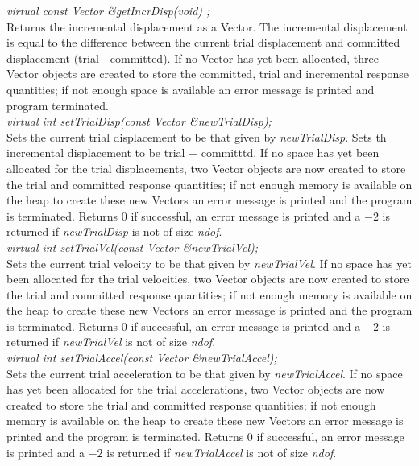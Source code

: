 {\em  virtual const Vector \&getIncrDisp(void) ;}  \\
Returns the incremental displacement as a Vector. The incremental displacement is 
equal to the difference between the current trial displacement and committed
displacement (trial - committed).
If no Vector has yet been allocated, three Vector 
objects are created to store the committed, trial and incremental response
quantities; if not enough space is available an error message
is printed and program terminated. \\ 


{\em virtual int setTrialDisp(const Vector \&newTrialDisp);} \\
Sets the current trial displacement to be that given by
{\em newTrialDisp}. Sets th incremental displacement to be trial $-$ committtd.
If no space has yet been allocated for
the trial displacements, two Vector objects are now created to store
the trial and committed response quantities; if not enough memory 
is available on the heap to create these new Vectors an error message
is printed and the program is terminated. Returns $0$ if successful,
an error message is printed and a $-2$ is returned if {\em
newTrialDisp} is not of size {\em ndof}. \\


{\em virtual int setTrialVel(const Vector \&newTrialVel);} \\
Sets the current trial velocity to be that given by
{\em newTrialVel}. If no space has yet been allocated for
the trial velocities, two Vector objects are now created to store
the trial and committed response quantities; if not enough memory 
is available on the heap to create these new Vectors an error message
is printed and the program is terminated. Returns $0$ if successful,
an error message is printed and a $-2$ is returned if {\em
newTrialVel} is not of size {\em ndof}. \\

{\em virtual int setTrialAccel(const Vector \&newTrialAccel);} \\
Sets the current trial acceleration to be that given by
{\em newTrialAccel}. If no space has yet been allocated for
the trial accelerations, two Vector objects are now created to store
the trial and committed response quantities; if not enough memory 
is available on the heap to create these new Vectors an error message
is printed and the program is terminated. Returns $0$ if successful,
an error message is printed and a $-2$ is returned if {\em
newTrialAccel} is not of size {\em ndof}. \\

